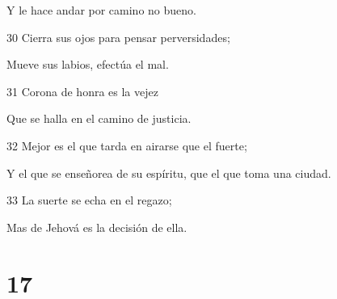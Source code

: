 \par Y le hace andar por camino no bueno.
\par 30 Cierra sus ojos para pensar perversidades;
\par Mueve sus labios, efectúa el mal.
\par 31 Corona de honra es la vejez
\par Que se halla en el camino de justicia.
\par 32 Mejor es el que tarda en airarse que el fuerte;
\par Y el que se enseñorea de su espíritu, que el que toma una ciudad.
\par 33 La suerte se echa en el regazo;
\par Mas de Jehová es la decisión de ella.


\chapter{17}

